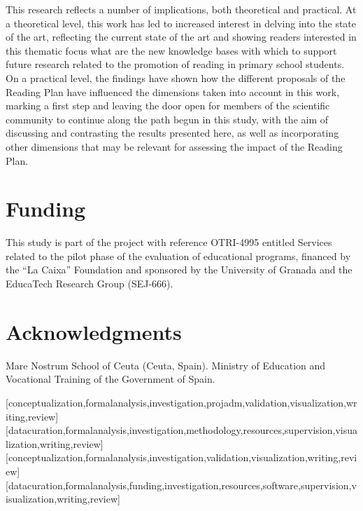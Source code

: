 \documentclass[english]{textolivre}
\begin{document}
This research reflects a number of implications, both theoretical and practical. At a theoretical level, this work has led to increased interest in delving into the state of the art, reflecting the current state of the art and showing readers interested in this thematic focus what are the new knowledge bases with which to support future research related to the promotion of reading in primary school students. On a practical level, the findings have shown how the different proposals of the Reading Plan have influenced the dimensions taken into account in this work, marking a first step and leaving the door open for members of the scientific community to continue along the path begun in this study, with the aim of discussing and contrasting the results presented here, as well as incorporating other dimensions that may be relevant for assessing the impact of the Reading Plan.

\section{Funding}
This study is part of the project with reference OTRI-4995 entitled Services related to the pilot phase of the evaluation of educational programs, financed by the “La Caixa” Foundation and sponsored by the University of Granada and the EducaTech Research Group (SEJ-666).

\section{Acknowledgments}
Mare Nostrum School of Ceuta (Ceuta, Spain). Ministry of Education and Vocational Training of the Government of Spain.


\printbibliography\label{sec-bib}


\begin{contributors}
[conceptualization,formalanalysis,investigation,projadm,validation,visualization,writing,review]
[datacuration,formalanalysis,investigation,methodology,resources,supervision,visualization,writing,review]
[conceptualization,formalanalysis,investigation,validation,visualization,writing,review]
[datacuration,formalanalysis,funding,investigation,resources,software,supervision,visualization,writing,review]
\end{contributors}
\end{document}
